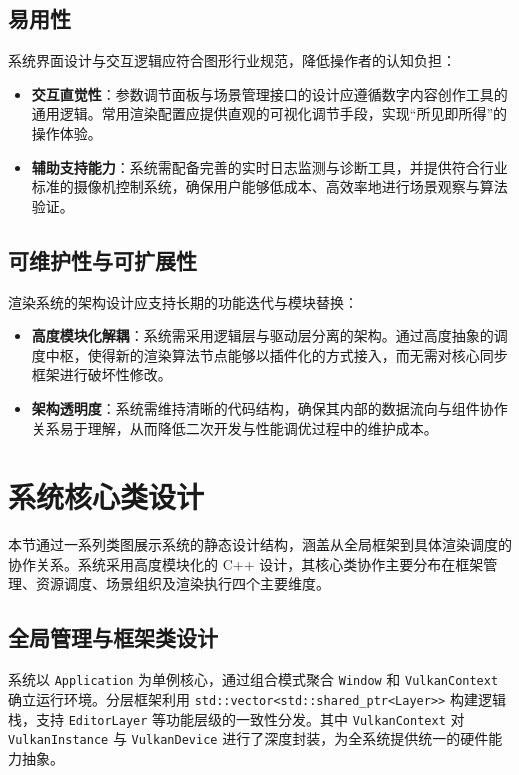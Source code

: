 \subsection{易用性}
系统界面设计与交互逻辑应符合图形行业规范，降低操作者的认知负担：
\begin{itemize}
    \item \textbf{交互直觉性}：参数调节面板与场景管理接口的设计应遵循数字内容创作工具的通用逻辑。常用渲染配置应提供直观的可视化调节手段，实现“所见即所得”的操作体验。
    \item \textbf{辅助支持能力}：系统需配备完善的实时日志监测与诊断工具，并提供符合行业标准的摄像机控制系统，确保用户能够低成本、高效率地进行场景观察与算法验证。
\end{itemize}

\subsection{可维护性与可扩展性}
渲染系统的架构设计应支持长期的功能迭代与模块替换：
\begin{itemize}
    \item \textbf{高度模块化解耦}：系统需采用逻辑层与驱动层分离的架构。通过高度抽象的调度中枢，使得新的渲染算法节点能够以插件化的方式接入，而无需对核心同步框架进行破坏性修改。
    \item \textbf{架构透明度}：系统需维持清晰的代码结构，确保其内部的数据流向与组件协作关系易于理解，从而降低二次开发与性能调优过程中的维护成本。
\end{itemize}

\section{系统核心类设计}
本节通过一系列类图展示系统的静态设计结构，涵盖从全局框架到具体渲染调度的协作关系。系统采用高度模块化的 C++ 设计，其核心类协作主要分布在框架管理、资源调度、场景组织及渲染执行四个主要维度。

\subsection{全局管理与框架类设计}
系统以 \texttt{Application} 为单例核心，通过组合模式聚合 \texttt{Window} 和 \texttt{VulkanContext} 确立运行环境。分层框架利用 \texttt{std::vector<std::shared\_ptr<Layer>>} 构建逻辑栈，支持 \texttt{EditorLayer} 等功能层级的一致性分发。其中 \texttt{VulkanContext} 对 \texttt{VulkanInstance} 与 \texttt{VulkanDevice} 进行了深度封装，为全系统提供统一的硬件能力抽象。


